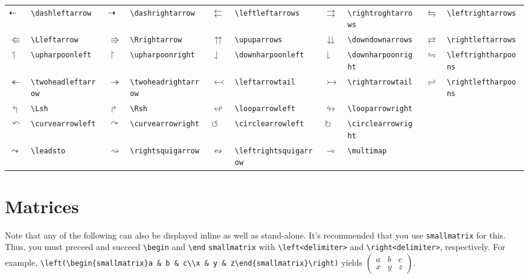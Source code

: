\documentclass[10pt, english]{article}
\begin{document}
	\begin{center}
		\scriptsize
	\begin{tabular}{ll|ll|ll|ll|ll}
		$\dashleftarrow$ & \verb|\dashleftarrow| & $\dashrightarrow$ & \verb|\dashrightarrow| & $\leftleftarrows$ & \verb|\leftleftarrows| & $\rightrightarrows$ & \verb|\rightroghtarrows| & $\leftrightarrows$ & \verb|\leftrightarrows| \\ 
		$\Lleftarrow$ & \verb|\Lleftarrow| & $\Rrightarrow$ & \verb|\Rrightarrow| & $\upuparrows$ & \verb|\upuparrows| & $\downdownarrows$ & \verb|\downdownarrows| & $\rightleftarrows$ & \verb|\rightleftarrows| \\
		$\upharpoonleft$ & \verb|\upharpoonleft| & $\upharpoonright$ & \verb|\upharpoonright| & $\downharpoonleft$ & \verb|\downharpoonleft| & $\downharpoonright$ & \verb|\downharpoonright| & $\leftrightharpoons$ & \verb|\leftrightharpoons|\\
		$\twoheadleftarrow$ & \verb|\twoheadleftarrow| & $\twoheadrightarrow$ & \verb|\twoheadrightarrow| & $\leftarrowtail$ & \verb|\leftarrowtail| & $\rightarrowtail$ & \verb|\rightarrowtail| & $\rightleftharpoons$ & \verb|\rightleftharpoons| \\
		$\Lsh$ & \verb|\Lsh| & $\Rsh$ & \verb|\Rsh| & $\looparrowleft$ & \verb|\looparrowleft| & $\looparrowright$ & \verb|\looparrowright| \\
		$\curvearrowleft$ & \verb|\curvearrowleft| & $\curvearrowright$ & \verb|\curvearrowright| & $\circlearrowleft$ & \verb|\circlearrowleft| & $\circlearrowright$ & \verb|\circlearrowright| \\
		$\leadsto$ & \verb|\leadsto| & $\rightsquigarrow$ & \verb|\rightsquigarrow| & $\leftrightsquigarrow$ & \verb|\leftrightsquigarrow| & $\multimap$ & \verb|\multimap| \\
	\end{tabular}
	\end{center}

\section{Matrices}

Note that any of the following can also be displayed inline as well as stand-alone. It's recommended that you use \verb|smallmatrix| for this. Thus, you must preceed and succeed \verb|\begin| and \verb|\end| \verb|smallmatrix| with \verb|\left<delimiter>| and \verb|\right<delimiter>|, respectively. For example, \verb|\left(\begin{smallmatrix}a & b & c\\x & y & z\end{smallmatrix}\right)| yields $\left(\begin{smallmatrix}a & b & c\\x & y & z\end{smallmatrix}\right)$. 
\end{document}
